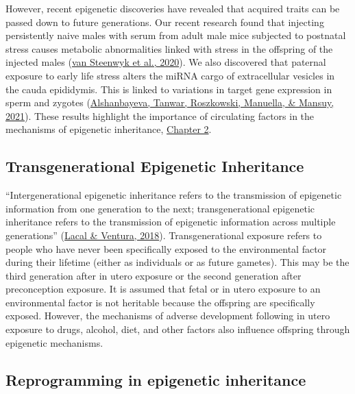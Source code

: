 \documentclass[12pt,twoside]{reedthesis}
\begin{document}
However, recent epigenetic discoveries have revealed that acquired
traits can be passed down to future generations. Our recent research
found that injecting persistently naive males with serum from adult male
mice subjected to postnatal stress causes metabolic abnormalities linked
with stress in the offspring of the injected males (\protect\hyperlink{ref-vansteenwyk2020}{van Steenwyk et al., 2020}).
We also discovered that paternal exposure to early life stress alters
the miRNA cargo of extracellular vesicles in the cauda epididymis. This
is linked to variations in target gene expression in sperm and zygotes
(\protect\hyperlink{ref-alshanbayeva2021}{Alshanbayeva, Tanwar, Roszkowski, Manuella, \& Mansuy, 2021}). These results highlight the importance of
circulating factors in the mechanisms of epigenetic inheritance,
\protect\hyperlink{chapter2}{Chapter 2}.

\hypertarget{tei}{%
\subsection*{Transgenerational Epigenetic Inheritance}\label{tei}}

``Intergenerational epigenetic inheritance refers to the transmission of
epigenetic information from one generation to the next;
transgenerational epigenetic inheritance refers to the transmission of
epigenetic information across multiple generations'' (\protect\hyperlink{ref-lacal2018}{Lacal \& Ventura, 2018}).
Transgenerational exposure refers to people who have never been
specifically exposed to the environmental factor during their lifetime
(either as individuals or as future gametes). This may be the third
generation after in utero exposure or the second generation after
preconception exposure. It is assumed that fetal or in utero exposure to
an environmental factor is not heritable because the offspring are
specifically exposed. However, the mechanisms of adverse development
following in utero exposure to drugs, alcohol, diet, and other factors
also influence offspring through epigenetic mechanisms.

\hypertarget{reprogramming-in-epigenetic-inheritance}{%
\subsection*{Reprogramming in epigenetic inheritance}\label{reprogramming-in-epigenetic-inheritance}}
\end{document}
